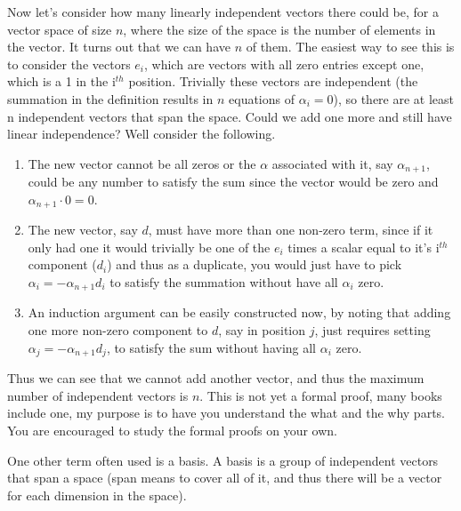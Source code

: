Now let's consider how many linearly independent vectors there could be, for a vector space of size $n$, where the size of the space is the number of elements in the vector.  It turns out that we can have $n$ of them.  The easiest way to see this is to consider the vectors $e_i$, which are vectors with all zero entries except one, which is a 1 in the i$^{th}$ position.  Trivially these vectors are independent (the summation in the definition results in $n$ equations of $\alpha_i=0$), so there are at least n independent vectors that span the space.  Could we add one more and still have linear independence?  Well consider the following.
\begin{enumerate}
\item The new vector cannot be all zeros or the $\alpha$ associated with it, say $\alpha_{n+1}$, could be any number to satisfy the sum since the vector would be zero and $\alpha_{n+1}\cdot 0=0$.
\item The new vector, say $d$, must have more than one non-zero term, since if it only had one it would trivially be one of the $e_i$ times a scalar equal to it's i$^{th}$ component ($d_i$) and thus as a duplicate, you would just have to pick $\alpha_i=-\alpha_{n+1}d_i$ to satisfy the summation without have all $\alpha_i$ zero.
\item An induction argument can be easily constructed now, by noting that adding one more non-zero component to $d$, say in position $j$, just requires setting $\alpha_j=-\alpha_{n+1}d_j$, to satisfy the sum without having all $\alpha_i$ zero.
\end{enumerate}
Thus we can see that we cannot add another vector, and thus the maximum number of independent vectors is $n$.  This is not yet a formal proof, many books include one, my purpose is to have you understand the what and the why parts.  You are encouraged to study the formal proofs on your own.

One other term often used is a basis.  A basis is a group of independent vectors that span a space (span means to cover all of it, and thus there will be a vector for each dimension in the space).

